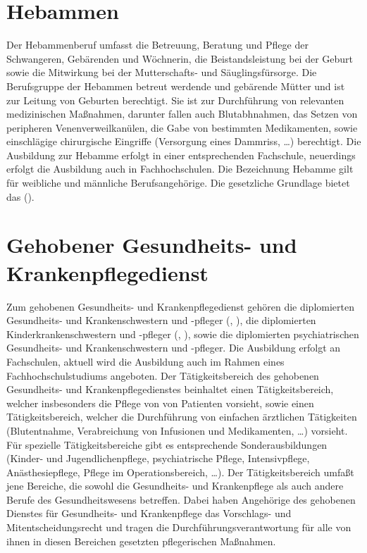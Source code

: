 \section{Hebammen}

\Text
{{\TxBeschreibung}}%
{%
Der Hebammenberuf umfasst die Betreuung, Beratung und Pflege
der Schwangeren, Gebärenden und Wöchnerin, die
Beistandsleistung bei der Geburt sowie die Mitwirkung bei
der Mutterschafts- und Säuglingsfürsorge. Die Berufsgruppe
der Hebammen betreut werdende und gebärende
Mütter und ist zur Leitung von Geburten berechtigt.
Sie ist zur Durchführung von relevanten medizinischen
Maßnahmen, darunter fallen auch Blutabhnahmen, das Setzen von
peripheren Venenverweilkanülen, die Gabe von bestimmten
Medikamenten, sowie einschlägige chirurgische
Eingriffe (Versorgung eines Dammriss, \ldots) berechtigt.
Die Ausbildung zur Hebamme erfolgt in einer entsprechenden
Fachschule, neuerdings erfolgt die Ausbildung auch in
Fachhochschulen. Die Bezeichnung Hebamme gilt für weibliche
und männliche Berufsangehörige.
Die gesetzliche Grundlage bietet das 
().
}%


\section{Gehobener Gesundheits- und Krankenpflegedienst}

\Text
{\TxBeschreibung}%
{%
Zum gehobenen Gesundheits- und Krankenpflegedienst gehören
die diplomierten Gesundheits- und Krankenschwestern und
-pfleger (,
),
die diplomierten Kinderkrankenschwestern und -pfleger 
(, ), sowie die diplomierten
psychiatrischen Gesundheits- und
Krankenschwestern und -pfleger.
Die Ausbildung erfolgt
an Fachschulen, aktuell
wird die Ausbildung auch im Rahmen eines Fachhochschulstudiums angeboten. 
Der Tätigkeitsbereich des gehobenen Gesundheits- und
Krankenpflegedienstes beinhaltet einen
Tätigkeitsbereich, welcher insbesonders die Pflege von
von Patienten vorsieht, sowie einen 
Tätigkeitsbereich, welcher die Durchführung von einfachen
ärztlichen Tätigkeiten (Blutentnahme, Verabreichung von
Infusionen und Medikamenten, \ldots) vorsieht. 
Für spezielle Tätigkeitsbereiche gibt es entsprechende
Sonderausbildungen (Kinder- und Jugendlichenpflege, psychiatrische 
Pflege, Intensivpflege, Anästhesiepflege, Pflege im 
Operationsbereich, \ldots).
Der  Tätigkeitsbereich umfaßt jene Bereiche, die 
sowohl die Gesundheits- und Krankenpflege als auch andere Berufe des 
Gesundheitswesens betreffen.
Dabei haben Angehörige des gehobenen Dienstes für Gesundheits- und 
Krankenpflege das Vorschlags- und Mitentscheidungsrecht und tragen 
die Durchführungsverantwortung für alle von ihnen in diesen Bereichen 
gesetzten pflegerischen Maßnahmen.
}%




\ChapterEnd
